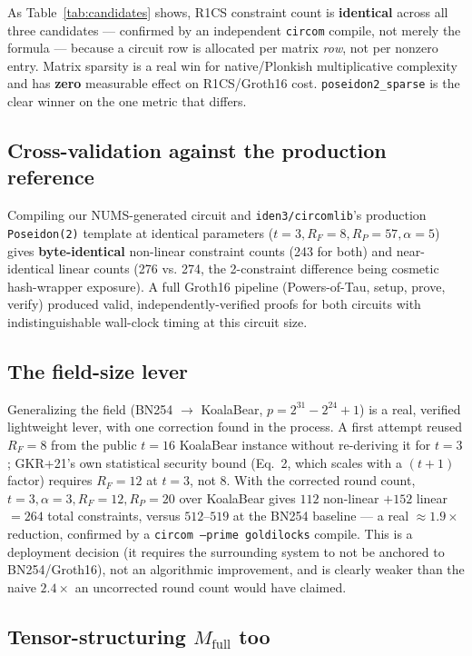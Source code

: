 \documentclass[11pt]{article}
\newcommand{\Mfull}{M_{\mathrm{full}}}
\begin{document}
As Table~\ref{tab:candidates} shows, R1CS constraint count is
\textbf{identical} across all three candidates --- confirmed by an
independent \texttt{circom} compile, not merely the formula --- because a
circuit row is allocated per matrix \emph{row}, not per nonzero entry.
Matrix sparsity is a real win for native/Plonkish multiplicative
complexity and has \textbf{zero} measurable effect on R1CS/Groth16 cost.
\texttt{poseidon2\_sparse} is the clear winner on the one metric that
differs.

\subsection{Cross-validation against the production reference}

Compiling our NUMS-generated circuit and \texttt{iden3/circomlib}'s
production \texttt{Poseidon(2)} template at identical parameters
($t=3,R_F=8,R_P=57,\alpha=5$) gives \textbf{byte-identical} non-linear
constraint counts (243 for both) and near-identical linear counts (276 vs.
274, the 2-constraint difference being cosmetic hash-wrapper exposure).
A full Groth16 pipeline (Powers-of-Tau, setup, prove, verify) produced
valid, independently-verified proofs for both circuits with
indistinguishable wall-clock timing at this circuit size.

\subsection{The field-size lever}

Generalizing the field (BN254 $\to$ KoalaBear, $p=2^{31}-2^{24}+1$) is a
real, verified lightweight lever, with one correction found in the
process. A first attempt reused $R_F=8$ from the public $t=16$ KoalaBear
instance without re-deriving it for $t=3$; GKR+21's own statistical
security bound (Eq.~2, which scales with a $(t+1)$ factor) requires
$R_F=12$ at $t=3$, not $8$. With the corrected round count,
$t=3,\alpha=3,R_F=12,R_P=20$ over KoalaBear gives $112$ non-linear $+ 152$
linear $= 264$ total constraints, versus $512$--$519$ at the BN254
baseline --- a real $\approx 1.9\times$ reduction, confirmed by a
\texttt{circom --prime goldilocks} compile. This is a deployment decision
(it requires the surrounding system to not be anchored to BN254/Groth16),
not an algorithmic improvement, and is clearly weaker than the naive
$2.4\times$ an uncorrected round count would have claimed.

\subsection{Tensor-structuring $\Mfull$ too}
\end{document}
